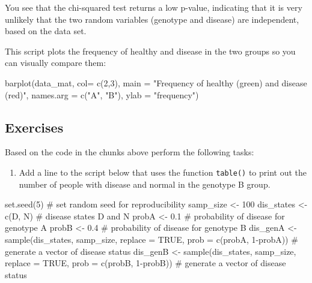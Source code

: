 \documentclass[
  letterpaper,
  DIV=11,
  numbers=noendperiod]{scrreprt}
\newenvironment{Shaded}{\begin{snugshade}}{\end{snugshade}}
\newcommand{\NormalTok}[1]{\textcolor[rgb]{0.00,0.23,0.31}{#1}}
\providecommand{\tightlist}{%
  \setlength{\itemsep}{0pt}\setlength{\parskip}{0pt}}\usepackage{longtable,booktabs,array}
\begin{document}
\begin{Shaded}
\end{Shaded}

You see that the chi-squared test returns a low p-value, indicating that
it is very unlikely that the two random variables (genotype and disease)
are independent, based on the data set.

This script plots the frequency of healthy and disease in the two groups
so you can visually compare them:

\begin{Shaded}
\begin{Highlighting}[]
\NormalTok{barplot(data\_mat, col= c(2,3), main = "Frequency of healthy (green) and disease (red)", names.arg = c("A", "B"), ylab = "frequency")}
\end{Highlighting}
\end{Shaded}

\hypertarget{exercises-28}{%
\subsection*{Exercises}\label{exercises-28}}

Based on the code in the chunks above perform the following tasks:

\begin{enumerate}
\def\labelenumi{\arabic{enumi}.}
\tightlist
\item
  Add a line to the script below that uses the function \texttt{table()}
  to print out the number of people with disease and normal in the
  genotype B group.
\end{enumerate}

\begin{Shaded}
\begin{Highlighting}[]
\NormalTok{set.seed(5) \# set random seed for reproducibility}
\NormalTok{samp\_size \textless{}{-} 100 }
\NormalTok{dis\_states \textless{}{-} c(\textquotesingle{}D\textquotesingle{}, \textquotesingle{}N\textquotesingle{}) \# disease states \textquotesingle{}D\textquotesingle{} and \textquotesingle{}N\textquotesingle{}}
\NormalTok{probA \textless{}{-} 0.1 \# probability of disease for genotype A}
\NormalTok{probB \textless{}{-} 0.4 \# probability of disease for genotype B}
\NormalTok{dis\_genA \textless{}{-} sample(dis\_states, samp\_size, replace = TRUE, prob = c(probA, 1{-}probA)) \# generate a vector of disease status}
\NormalTok{dis\_genB \textless{}{-} sample(dis\_states, samp\_size, replace = TRUE, prob = c(probB, 1{-}probB)) \# generate a vector of disease status}
\end{Highlighting}
\end{Shaded}
\end{document}
